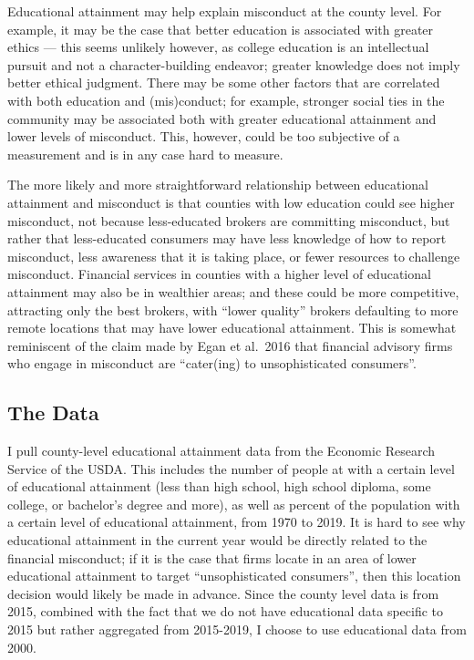 \documentclass[
]{article}
\begin{document}
Educational attainment may help explain misconduct at the county level.
For example, it may be the case that better education is associated with
greater ethics --- this seems unlikely however, as college education is
an intellectual pursuit and not a character-building endeavor; greater
knowledge does not imply better ethical judgment. There may be some
other factors that are correlated with both education and (mis)conduct;
for example, stronger social ties in the community may be associated
both with greater educational attainment and lower levels of misconduct.
This, however, could be too subjective of a measurement and is in any
case hard to measure.

The more likely and more straightforward relationship between
educational attainment and misconduct is that counties with low
education could see higher misconduct, not because less-educated brokers
are committing misconduct, but rather that less-educated consumers may
have less knowledge of how to report misconduct, less awareness that it
is taking place, or fewer resources to challenge misconduct. Financial
services in counties with a higher level of educational attainment may
also be in wealthier areas; and these could be more competitive,
attracting only the best brokers, with ``lower quality'' brokers
defaulting to more remote locations that may have lower educational
attainment. This is somewhat reminiscent of the claim made by Egan et
al.~2016 that financial advisory firms who engage in misconduct are
``cater(ing) to unsophisticated consumers''.

\hypertarget{the-data}{%
\subsection{The Data}\label{the-data}}

I pull county-level educational attainment data from the Economic
Research Service of the USDA. This includes the number of people at with
a certain level of educational attainment (less than high school, high
school diploma, some college, or bachelor's degree and more), as well as
percent of the population with a certain level of educational
attainment, from 1970 to 2019. It is hard to see why educational
attainment in the current year would be directly related to the
financial misconduct; if it is the case that firms locate in an area of
lower educational attainment to target ``unsophisticated consumers'',
then this location decision would likely be made in advance. Since the
county level data is from 2015, combined with the fact that we do not
have educational data specific to 2015 but rather aggregated from
2015-2019, I choose to use educational data from 2000.
\end{document}
